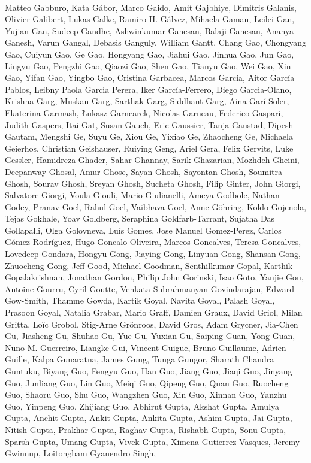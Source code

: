 \paragraph{}Matteo Gabburo, Kata Gábor, Marco Gaido, Amit Gajbhiye, Dimitris Galanis, Olivier Galibert, Lukas Galke, Ramiro H. Gálvez, Mihaela Gaman, Leilei Gan, Yujian Gan, Sudeep Gandhe, Ashwinkumar Ganesan, Balaji Ganesan, Ananya Ganesh, Varun Gangal, Debasis Ganguly, William Gantt, Chang Gao, Chongyang Gao, Cuiyun Gao, Ge Gao, Hongyang Gao, Jiahui Gao, Jinhua Gao, Jun Gao, Lingyu Gao, Pengzhi Gao, Qiaozi Gao, Shen Gao, Tianyu Gao, Wei Gao, Xin Gao, Yifan Gao, Yingbo Gao, Cristina Garbacea, Marcos Garcia, Aitor García Pablos, Leibny Paola Garcia Perera, Iker García-Ferrero, Diego Garcia-Olano, Krishna Garg, Muskan Garg, Sarthak Garg, Siddhant Garg, Aina Garí Soler, Ekaterina Garmash, Łukasz Garncarek, Nicolas Garneau, Federico Gaspari, Judith Gaspers, Itai Gat, Susan Gauch, Eric Gaussier, Tanja Gaustad, Dipesh Gautam, Mengshi Ge, Suyu Ge, Xiou Ge, Yixiao Ge, Zhaocheng Ge, Michaela Geierhos, Christian Geishauser, Ruiying Geng, Ariel Gera, Felix Gervits, Luke Gessler, Hamidreza Ghader, Sahar Ghannay, Sarik Ghazarian, Mozhdeh Gheini, Deepanway Ghosal, Amur Ghose, Sayan Ghosh, Sayontan Ghosh, Soumitra Ghosh, Sourav Ghosh, Sreyan Ghosh, Sucheta Ghosh, Filip Ginter, John Giorgi, Salvatore Giorgi, Voula Giouli, Mario Giulianelli, Ameya Godbole, Nathan Godey, Pranav Goel, Rahul Goel, Vaibhava Goel, Anne Göhring, Koldo Gojenola, Tejas Gokhale, Yoav Goldberg, Seraphina Goldfarb-Tarrant, Sujatha Das Gollapalli, Olga Golovneva, Luís Gomes, Jose Manuel Gomez-Perez, Carlos Gómez-Rodríguez, Hugo Goncalo Oliveira, Marcos Goncalves, Teresa Goncalves, Lovedeep Gondara, Hongyu Gong, Jiaying Gong, Linyuan Gong, Shansan Gong, Zhuocheng Gong, Jeff Good, Michael Goodman, Senthilkumar Gopal, Karthik Gopalakrishnan, Jonathan Gordon, Philip John Gorinski, Isao Goto, Yanjie Gou, Antoine Gourru, Cyril Goutte, Venkata Subrahmanyan Govindarajan, Edward Gow-Smith, Thamme Gowda, Kartik Goyal, Navita Goyal, Palash Goyal, Prasoon Goyal, Natalia Grabar, Mario Graff, Damien Graux, David Griol, Milan Gritta, Loïc Grobol, Stig-Arne Grönroos, David Gros, Adam Grycner, Jia-Chen Gu, Jiasheng Gu, Shuhao Gu, Yue Gu, Yuxian Gu, Saiping Guan, Yong Guan, Nuno M. Guerreiro, Liangke Gui, Vincent Guigue, Bruno Guillaume, Adrien Guille, Kalpa Gunaratna, James Gung, Tunga Gungor, Sharath Chandra Guntuku, Biyang Guo, Fengyu Guo, Han Guo, Jiang Guo, Jiaqi Guo, Jinyang Guo, Junliang Guo, Lin Guo, Meiqi Guo, Qipeng Guo, Quan Guo, Ruocheng Guo, Shaoru Guo, Shu Guo, Wangzhen Guo, Xin Guo, Xinnan Guo, Yanzhu Guo, Yinpeng Guo, Zhijiang Guo, Abhirut Gupta, Akshat Gupta, Amulya Gupta, Anchit Gupta, Ankit Gupta, Ankita Gupta, Ashim Gupta, Jai Gupta, Nitish Gupta, Prakhar Gupta, Raghav Gupta, Rishabh Gupta, Sonu Gupta, Sparsh Gupta, Umang Gupta, Vivek Gupta, Ximena Gutierrez-Vasques, Jeremy Gwinnup, Loitongbam Gyanendro Singh,
